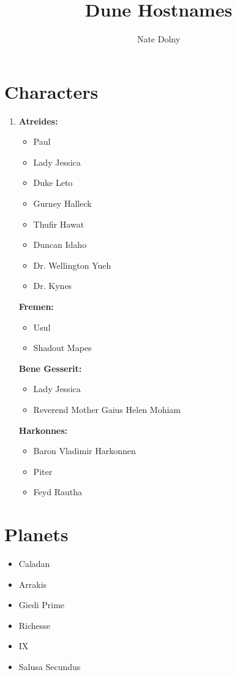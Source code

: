 \documentclass{article}
\title{\textbf{Dune Hostnames}}
\author{Nate Dolny}
\date{}
\begin{document}
\maketitle

\section{Characters}
\begin{enumerate}

    \item[] \textbf{Atreides:}
\begin{itemize}
\item Paul
\item Lady Jessica
\item Duke Leto
\item Gurney Halleck 
\item Thufir Hawat
\item Duncan Idaho 
\item Dr. Wellington Yueh
\item Dr. Kynes 
\end{itemize}


\textbf{Fremen:}
\begin{itemize}
\item Usul
\item Shadout Mapes
\end{itemize}


\textbf{Bene Gesserit:}
\begin{itemize}
\item Lady Jessica
\item Reverend Mother Gaius Helen Mohiam
\end{itemize}


\textbf{Harkonnes:}
\begin{itemize}
\item Baron Vladimir Harkonnen 
\item Piter
\item Feyd Rautha
\end{itemize}

\end{enumerate}

\section{Planets}
\begin{itemize}
\item Caladan 
\item Arrakis
\item Giedi Prime
\item Richesse
\item IX
\item Salusa Secundus
\end{itemize}
\end{document}
